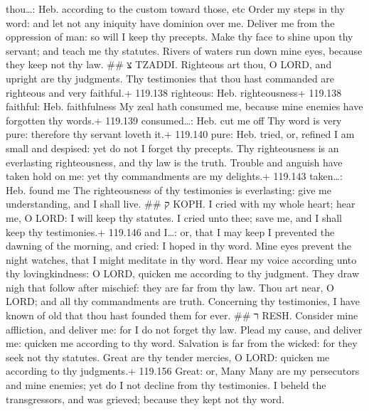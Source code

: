 thou\ldots: Heb. according to the custom toward those, etc
 Order my steps in thy word: and let not any iniquity have
dominion over me.  Deliver me from the oppression of man:
so will I keep thy precepts.  Make thy face to shine upon
thy servant; and teach me thy statutes.  Rivers of waters
run down mine eyes, because they keep not thy law. \#\# צ TZADDI.
 Righteous art thou, O LORD, and upright are thy
judgments.  Thy testimonies that thou hast commanded are
righteous and very faithful.+ 119.138 righteous: Heb. righteousness+
119.138 faithful: Heb. faithfulness  My zeal hath consumed
me, because mine enemies have forgotten thy words.+ 119.139
consumed\ldots: Heb. cut me off  Thy word is very pure:
therefore thy servant loveth it.+ 119.140 pure: Heb. tried, or, refined
 I am small and despised: yet do not I forget thy
precepts.  Thy righteousness is an everlasting
righteousness, and thy law is the truth.  Trouble and
anguish have taken hold on me: yet thy commandments are my delights.+
119.143 taken\ldots: Heb. found me  The righteousness of
thy testimonies is everlasting: give me understanding, and I shall live.
\#\# ק KOPH.  I cried with my whole heart; hear me, O
LORD: I will keep thy statutes.  I cried unto thee; save
me, and I shall keep thy testimonies.+ 119.146 and I\ldots: or, that I
may keep  I prevented the dawning of the morning, and
cried: I hoped in thy word.  Mine eyes prevent the night
watches, that I might meditate in thy word.  Hear my voice
according unto thy lovingkindness: O LORD, quicken me according to thy
judgment.  They draw nigh that follow after mischief: they
are far from thy law.  Thou art near, O LORD; and all thy
commandments are truth.  Concerning thy testimonies, I
have known of old that thou hast founded them for ever. \#\# ר RESH.
 Consider mine affliction, and deliver me: for I do not
forget thy law.  Plead my cause, and deliver me: quicken
me according to thy word.  Salvation is far from the
wicked: for they seek not thy statutes.  Great are thy
tender mercies, O LORD: quicken me according to thy judgments.+ 119.156
Great: or, Many  Many are my persecutors and mine enemies;
yet do I not decline from thy testimonies.  I beheld the
transgressors, and was grieved; because they kept not thy word.
